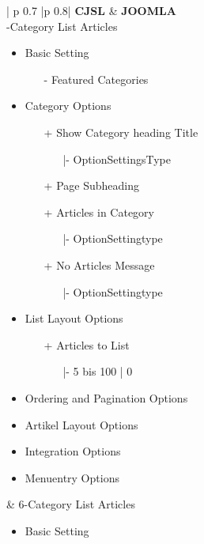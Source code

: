 \begin{minipage}{0.7\textwidth}
\begin{longtable}{| p {0.7\textwidth} |p {0.8\textwidth}|}
\hline
\textbf{CJSL} 
&  
\textbf{JOOMLA} \\ -Category List Articles
\begin{itemize}
\item Basic Setting
	\begin{enumerate}
			\item[-] Featured Categories
	 \end{enumerate}
\item Category Options
	\begin{enumerate}
		\item[+]Show Category heading Title  
			\begin{enumerate}
			\item[|-] OptionSettingsType
			\end{enumerate}
		\item[+] Page Subheading
		\item[+] Articles in Category
	   		\begin{enumerate}
	   			\item[|-] OptionSettingtype
	   		\end{enumerate}
	   	\item[+] No Articles Message
	   		\begin{enumerate}
	   			\item[|-] OptionSettingtype
	   		\end{enumerate}  
	\end{enumerate}
\item List Layout Options
\begin{enumerate}
   	   	\item[+] Articles to List
   	   	\begin{enumerate}
   	   				\item[|-] 5 bis 100 | 0
   	   			\end{enumerate}
   	   	\end{enumerate}
\item Ordering and Pagination Options
\item Artikel Layout Options
\item Integration Options
\item Menuentry Options
\end{itemize}
&
6-Category List Articles
\begin{itemize}
\item Basic Setting

\end{itemize}
\end{longtable}
\end{minipage}
